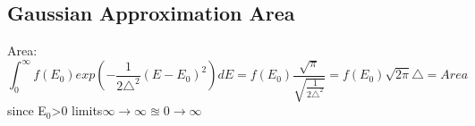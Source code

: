 \documentclass[11pt]{article}
\begin{document}
	\subsection{Gaussian Approximation Area}
	
	Area:
	\[
		\int_{0}^{\infty} f(E_0) exp(-\frac{1}{2\triangle^2}(E-E_0)^2) dE = f(E_0)\frac{\sqrt{\pi}}{\sqrt{\frac{1}{2\triangle^2}}} = \boxed{f(E_0)\sqrt{2\pi}\triangle = Area}
	\]
	since E$_0$>0 limits$\infty\rightarrow\infty \approxeq 0\rightarrow \infty$ 
	
	
\end{document}
